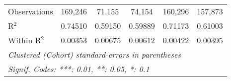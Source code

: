 \begin{table}[htbp]
\begin{tabular}{lccccc}
      Observations         & 169,246       & 71,155         & 74,154       & 160,296                & 157,873\\
      R$^2$                & 0.74510       & 0.59150        & 0.59889      & 0.71173                & 0.61003\\
      Within R$^2$         & 0.00353       & 0.00675        & 0.00612      & 0.00422                & 0.00395\\
      \midrule\midrule\multicolumn{6}{l}{\emph{Clustered (Cohort) standard-errors in parentheses}}\\
      \multicolumn{6}{l}{\emph{Signif. Codes: ***: 0.01, **: 0.05, *: 0.1}}\\
   \end{tabular}
\end{table}


